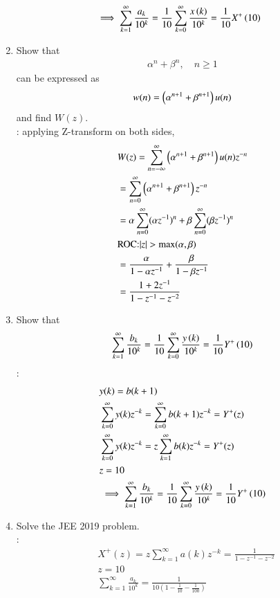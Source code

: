 \documentclass[journal,12pt,twocolumn]{IEEEtran}
\renewcommand\thesection{\arabic{section}}
\begin{document}
\begin{enumerate}[label=\thesection.\arabic*,ref=\thesection.\theenumi]
\begin{align}
	&\implies \sum_{k=1}^{\infty}\frac{a_k}{10^k}= 
	\frac{1}{10}\sum_{k=0}^{\infty}\frac{x\left(k\right)}{10^k} =\frac{1}{10}X^{+}\left({10}\right)
\end{align}
\item Show that 
\begin{align}
	\alpha^n + \beta^n, \quad n \ge 1
\end{align}
can be expressed as 
\begin{align}
	w(n) =\left(\alpha^{n+1} + \beta^{n+1}\right)u(n)
\end{align}
and find $W(z)$.\\
\solution:
applying Z-transform on both sides,
\begin{align}
	&W(z)=\sum_{n=-\infty}^{\infty}\brak{\alpha^{n+1} + \beta^{n+1}}u(n)z^{-n}\\
	&=\sum_{n=0}^{\infty}\brak{\alpha^{n+1} + \beta^{n+1}}z^{-n}\\
	&=\alpha \sum_{n=0}^{\infty}(\alpha z^{-1})^{n}+\beta \sum_{n=0}^{\infty} (\beta z^{-1})^{n}\\
	&\text{ROC:} |z|>\text{max}(\alpha,\beta)\\
	&=\frac{\alpha}{1-\alpha z^{-1}}+\frac{\beta}{1-\beta z^{-1}}\\
	&=\frac{1+2z^{-1}}{1-z^{-1}-z^{-2}}
\end{align}
\item Show that 
\begin{align}
	\sum_{k=1}^{\infty}\frac{b_k}{10^k} =
	\frac{1}{10}\sum_{k=0}^{\infty}\frac{y\left(k\right)}{10^k} =\frac{1}{10}Y^{+}\left({10}\right)
\end{align}
\solution:
\begin{align}
	&y(k)=b(k+1)\\
	&\sum_{k=0}^{\infty} y(k) z^{-k}=\sum_{k=0}^{\infty} b(k+1) z^{-k}=Y^{+}(z)\\
	&\sum_{k=0}^{\infty} y(k) z^{-k}=z\sum_{k=1}^{\infty} b(k) z^{-k}=Y^{+}(z)\\
	&z=10\\
	&\implies \sum_{k=1}^{\infty}\frac{b_k}{10^k} =
	\frac{1}{10}\sum_{k=0}^{\infty}\frac{y\left(k\right)}{10^k} =\frac{1}{10}Y^{+}\left({10}\right)
\end{align}
\item Solve the JEE 2019 problem.\\
\solution:
\begin{align}
	&X^{+}(z)=z\sum_{k=1}^{\infty} a(k) z^{-k}=\frac{1}{1-z^{-1}-z^{-2}}\\
	&z=10\\
	&\sum_{k=1}^{\infty} \frac{a_k}{10^k}=\frac{1}{10 \left(1-\frac{1}{10}-\frac{1}{100}\right)}\\

\end{align}
\end{enumerate}
\end{document}
